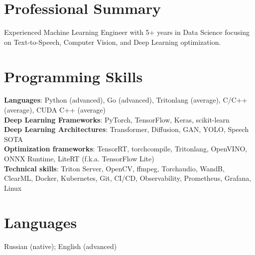 \section{\sc Professional Summary}
Experienced Machine Learning Engineer with 5+ years in Data Science focusing on Text-to-Speech, Computer Vision, and Deep Learning optimization.

\section{\sc Programming Skills}
\textbf{Languages}: Python (advanced), Go (advanced), Tritonlang (average), C/C++ (average), CUDA C++ (average) \\
\textbf{Deep Learning Frameworks}: PyTorch, TensorFlow, Keras, scikit-learn \\
\textbf{Deep Learning Architectures}: Transformer, Diffusion, GAN, YOLO, Speech SOTA \\
\textbf{Optimization frameworks}: TensorRT, torchcompile, Tritonlang, OpenVINO, ONNX Runtime, LiteRT (f.k.a. TensorFlow Lite) \\
\textbf{Technical skills}: Triton Server, OpenCV, ffmpeg, Torchaudio, WandB, ClearML, Docker, Kubernetes, Git, CI/CD, Observability, Prometheus, Grafana, Linux

\section{\sc Languages}
{Russian (native); English (advanced)}

\endinput
